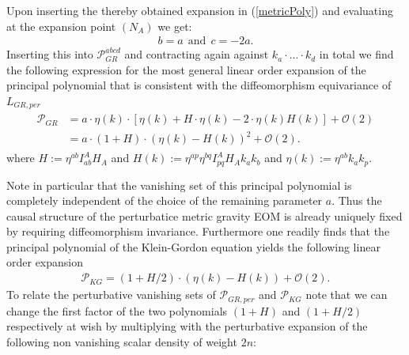 \documentclass[a4paper,12pt, DIV=14, BCOR=5mm, twoside, headsepline]{scrbook}
\begin{document}
Upon inserting the thereby obtained expansion in (\ref{metricPoly}) and evaluating at the expansion point $(N_A)$ we get:
\begin{align}
    b = a \ \ \text{and} \ \ c = -2a.
\end{align}
Inserting this into $\mathcal{P}_{GR}^{abcd}$ and contracting again against $k_a\cdot ...\cdot k_d$ in total we find the following expression for the most general linear order expansion of the principal polynomial that is consistent with the diffeomorphism equivariance of $L_{GR,per}$
\begin{align}
\begin{aligned}
    \mathcal{P}_{GR} &= a \cdot  \eta(k) \cdot \left [\eta(k) + H \cdot \eta(k)  -
    2 \cdot  \eta(k) H(k) \right ] + \mathcal{O}(2)\\
    &= a \cdot (1 + H) \cdot (\eta(k) - H(k))^2 + \mathcal{O}(2).
\end{aligned}
\end{align}
where  $H:=\eta^{ab} I^A_{ab} H_{A}$ and $H(k) := \eta^{ap} \eta^{bq} I_{pq}^A H_A k_a k_b$ and $\eta(k) := \eta^{ab}k_a k_p$. 

Note in particular that the vanishing set of this principal polynomial is completely independent of the choice of the remaining parameter $a$. Thus the causal structure of the perturbatice metric gravity EOM is already uniquely fixed by requiring diffeomorphism invariance.
Furthermore one readily finds that the principal polynomial of the Klein-Gordon equation yields the following linear order expansion
\begin{align}
    \mathcal{P}_{KG} = (1 + H/2) \cdot (\eta(k) - H(k)) + \mathcal{O}(2) .
\end{align}
To relate the perturbative vanishing sets of $\mathcal{P}_{GR,per}$ and $\mathcal{P}_{KG}$ note that we can change the first factor of the two polynomials $(1+H)$ and $(1+H/2)$ respectively at wish by multiplying with the perturbative expansion of the following non vanishing scalar density of weight $2n$:
\end{document}
